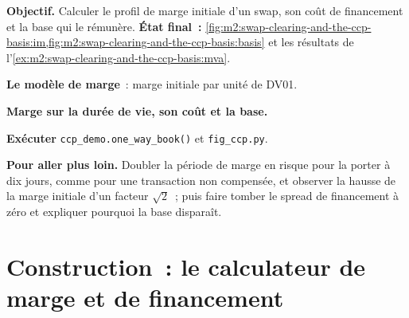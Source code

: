 \begin{tutorial}
\textbf{Objectif.} Calculer le profil de marge initiale d'un swap, son coût de financement
et la base qui le rémunère. \textbf{État final~:}
\cref{fig:m2:swap-clearing-and-the-ccp-basis:im,fig:m2:swap-clearing-and-the-ccp-basis:basis}
et les résultats de l'\cref{ex:m2:swap-clearing-and-the-ccp-basis:mva}.
\begin{tutsteps}
\item \textbf{Le modèle de marge}~: marge initiale par unité de DV01.
\label{lst:m2:swap-clearing-and-the-ccp-basis:model}
\item \textbf{Marge sur la durée de vie, son coût et la base.}
\label{lst:m2:swap-clearing-and-the-ccp-basis:mva}
\item \textbf{Exécuter} \texttt{ccp\_demo.one\_way\_book()} et
\texttt{fig\_ccp.py}.
\end{tutsteps}
\textbf{Pour aller plus loin.} Doubler la période de marge en risque pour la porter à dix jours, comme
pour une transaction non compensée, et observer la hausse de la marge initiale d'un facteur $\sqrt 2$~; puis
faire tomber le spread de financement à zéro et expliquer pourquoi la base disparaît.
\end{tutorial}

\section{Construction~: le calculateur de marge et de financement}\label{bld:m2:swap-clearing-and-the-ccp-basis:mva}

